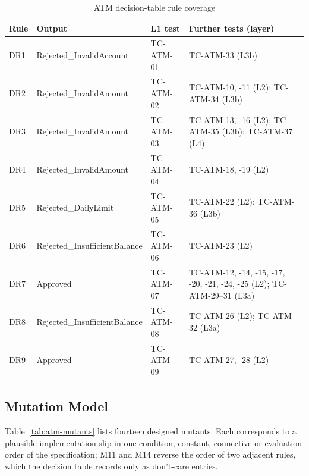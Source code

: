 \documentclass[11pt,a4paper]{article}
\begin{document}
\begin{table}[H]
\centering
\caption{ATM decision-table rule coverage}
\label{tab:atm-rule-coverage}
\small
\begin{tabularx}{\textwidth}{l l l Y}
\toprule
Rule & Output & L1 test & Further tests (layer) \\
\midrule
DR1 & Rejected\_InvalidAccount & TC-ATM-01 & TC-ATM-33 (L3b) \\
DR2 & Rejected\_InvalidAmount & TC-ATM-02 & TC-ATM-10, -11 (L2); TC-ATM-34 (L3b) \\
DR3 & Rejected\_InvalidAmount & TC-ATM-03 & TC-ATM-13, -16 (L2); TC-ATM-35 (L3b); TC-ATM-37 (L4) \\
DR4 & Rejected\_InvalidAmount & TC-ATM-04 & TC-ATM-18, -19 (L2) \\
DR5 & Rejected\_DailyLimit & TC-ATM-05 & TC-ATM-22 (L2); TC-ATM-36 (L3b) \\
DR6 & Rejected\_InsufficientBalance & TC-ATM-06 & TC-ATM-23 (L2) \\
DR7 & Approved & TC-ATM-07 & TC-ATM-12, -14, -15, -17, -20, -21, -24, -25 (L2); TC-ATM-29--31 (L3a) \\
DR8 & Rejected\_InsufficientBalance & TC-ATM-08 & TC-ATM-26 (L2); TC-ATM-32 (L3a) \\
DR9 & Approved & TC-ATM-09 & TC-ATM-27, -28 (L2) \\
\bottomrule
\end{tabularx}
\end{table}
\subsection{Mutation Model}
\label{sec:atm-mutants}

Table~\ref{tab:atm-mutants} lists fourteen designed mutants. Each
corresponds to a plausible implementation slip in one condition, constant,
connective or evaluation order of the specification; M11 and M14 reverse the
order of two adjacent rules, which the decision table records only as
don't-care entries.
\end{document}
